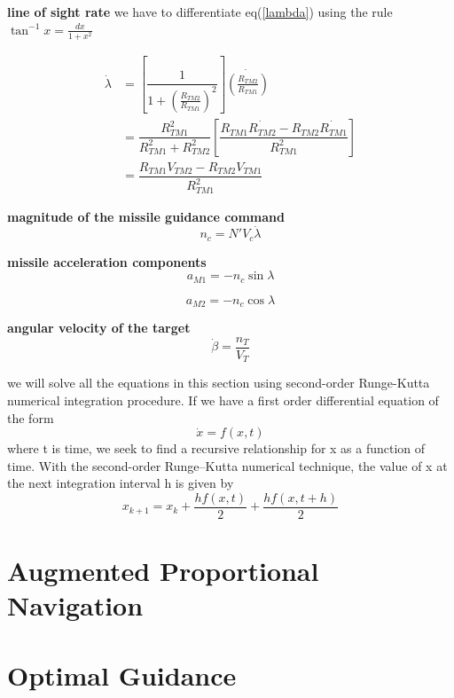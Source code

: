 \textbf{line of sight rate} we have to differentiate eq(\ref{lambda}) using the rule $\tan^{-1}x = \frac{dx}{1+x^2}$ 

\begin{equation}
\begin{split}
\dot{\lambda} &= [\dfrac{1}{1+(\frac{R_{TM2}}{R_{TM1}})^2}] \dot{(\frac{R_{TM2}}{R_{TM1}})}\\
&= \dfrac{R_{TM1}^2}{R_{TM1}^2 + R_{TM2}^2}[\dfrac{R_{TM1}\dot{R_{TM2}}- R_{TM2} \dot{R_{TM1}}}{R_{TM1}^2}]\\
&=\dfrac{R_{TM1} V_{TM2} - R_{TM2} V_{TM1}}{R_{TM1}^2}
\end{split}
\end{equation}

\textbf{magnitude of the missile guidance command}
\begin{equation}
n_c= N' V_c \dot{\lambda}
\end{equation}

\textbf{missile acceleration components}
\begin{equation}
a_{M1} = - n_c \sin \lambda
\end{equation}

\begin{equation}
a_{M2} = - n_c \cos \lambda
\end{equation}

\textbf{angular velocity of the target}
\begin{equation}
\dot{\beta} = \dfrac{n_T}{V_T}
\end{equation}

we will solve all the equations in this section using second-order Runge-Kutta numerical integration procedure. If we have a first order differential equation of the form 
\begin{equation*}
	\dot{x} = f(x,t) 
\end{equation*} 
where t is time, we seek to find a recursive relationship for x as a function of time.
With the second-order Runge–Kutta numerical technique, the value of x at the
next integration interval h is given by
\begin{equation*}
	x_{k+1} = x_k + \dfrac{hf(x,t)}{2} + \dfrac{h f(x, t+h)}{2}
\end{equation*}


\section{Augmented Proportional Navigation}





\section{Optimal Guidance}

